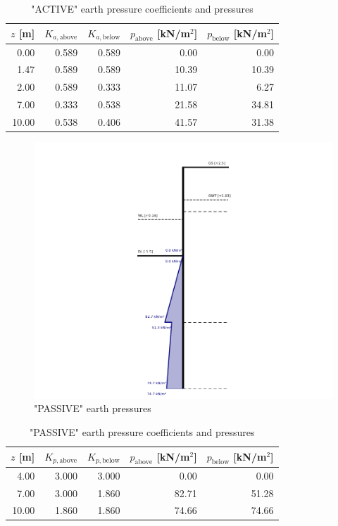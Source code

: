 \begin{table}[H]
  \centering
  \caption{"ACTIVE" earth pressure coefficients and pressures}
  \label{tab:appendix_active_pressures}
  \small
  \setlength{\tabcolsep}{8pt}
  \renewcommand{\arraystretch}{1.15}
  \begin{tabular}{@{}r r r r r@{}}
    \toprule
    $z$ [m] &
    $K_{a,\text{above}}$ &
    $K_{a,\text{below}}$ &
    $p_{\text{above}}$ [kN/m$^2$] &
    $p_{\text{below}}$ [kN/m$^2$] \\
    \midrule
     0.00 & 0.589 & 0.589 &  0.00 &  0.00 \\
     1.47 & 0.589 & 0.589 & 10.39 & 10.39 \\
     2.00 & 0.589 & 0.333 & 11.07 &  6.27 \\
     7.00 & 0.333 & 0.538 & 21.58 & 34.81 \\
    10.00 & 0.538 & 0.406 & 41.57 & 31.38 \\
    \bottomrule
  \end{tabular}
\end{table}

\begin{figure}[H]
    \centering
    \includegraphics[width=0.75\linewidth]{figures/appendix-i/passive_earth_pressure.png}
    \caption{"PASSIVE" earth pressures}
    \label{fig:appendix_passive_earth_pressure}
\end{figure}

\begin{table}[H]
  \centering
  \caption{"PASSIVE" earth pressure coefficients and pressures}
  \label{tab:appendix_passive_pressures_coeffiecients}
  \small
  \setlength{\tabcolsep}{8pt}
  \renewcommand{\arraystretch}{1.15}
  \begin{tabular}{@{}r r r r r@{}}
    \toprule
    $z$ [m] &
    $K_{p,\text{above}}$ &
    $K_{p,\text{below}}$ &
    $p_{\text{above}}$ [kN/m$^2$] &
    $p_{\text{below}}$ [kN/m$^2$] \\
    \midrule
     4.00 & 3.000 & 3.000 &  0.00 &  0.00 \\
     7.00 & 3.000 & 1.860 & 82.71 & 51.28 \\
    10.00 & 1.860 & 1.860 & 74.66 & 74.66 \\
    \bottomrule
  \end{tabular}
\end{table}

